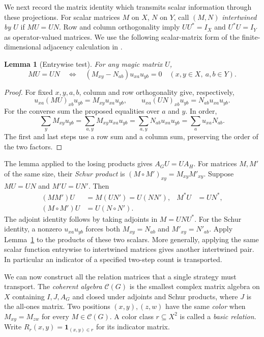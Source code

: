 \documentclass[11pt,reqno]{amsart}
\numberwithin{equation}{section}
\newtheorem{lemma}[theorem]{Lemma}
\theoremstyle{definition}
\begin{document}
\noindent We next record the matrix identity which transmits scalar information through these projections.
For scalar matrices $M$ on $X$, $N$ on $Y$, call $(M,N)$
\emph{intertwined by $U$} if $MU=UN$. Row and column orthogonality imply
$UU^*=I_X$ and $U^*U=I_Y$ as operator-valued matrices. We use the
following scalar-matrix form of the finite-dimensional adjacency calculation in
\cite[proof of Thm.~5.8]{AMRSSV}.

\begin{lemma}[Entrywise test]\label{lem:transport-test}
For any magic matrix $U$,
\[
 MU=UN\quad\Longleftrightarrow\quad
 (M_{xy}-N_{ab})u_{xa}u_{yb}=0
 \quad(x,y\in X,\ a,b\in Y).
\]
\end{lemma}
\begin{proof}
For fixed $x,y,a,b$, column and row orthogonality give, respectively,
\[
 u_{xa}(MU)_{xb}u_{yb}=M_{xy}u_{xa}u_{yb},
 \qquad
 u_{xa}(UN)_{xb}u_{yb}=N_{ab}u_{xa}u_{yb}.
\]
For the converse sum the proposed equalities over $a$ and $y$. In order,
\[
 \sum_y M_{xy}u_{yb}
 =\sum_{a,y} M_{xy}u_{xa}u_{yb}
 =\sum_{a,y} N_{ab}u_{xa}u_{yb}
 =\sum_a u_{xa}N_{ab}.
\]
The first and last steps use a row sum and a column sum, preserving the order of the two factors.
\end{proof}

The lemma applied to the losing products gives $A_GU=UA_H$.
For matrices $M,M'$ of the same size, their \emph{Schur product} is
$(M\circ M')_{xy}=M_{xy}M'_{xy}$. Suppose $MU=UN$ and $M'U=UN'$.
Then
\begin{align*}
 (MM')U&=M(UN')=U(NN'),&
 M^*U&=UN^*,\\
 (M\circ M')U&=U(N\circ N'). &&
\end{align*}
The adjoint identity follows by taking adjoints in $M=UNU^*$.
For the Schur identity, a nonzero $u_{xa}u_{yb}$ forces both
$M_{xy}=N_{ab}$ and $M'_{xy}=N'_{ab}$. Apply
Lemma~\ref{lem:transport-test} to the products of these two scalars.
More generally, applying the same scalar function entrywise to intertwined matrices gives another intertwined pair.
In particular an indicator of a specified two-step count is transported.

We can now construct all the relation matrices that a single strategy must transport.
The \emph{coherent algebra} $\mathcal C(G)$ is the smallest complex matrix
algebra on $X$ containing $I,J,A_G$ and closed under adjoints and Schur
products, where $J$ is the all-ones matrix. Two positions $(x,y),(z,w)$
have the same \emph{color} when $M_{xy}=M_{zw}$ for every $M\in\mathcal C(G)$.
A color class $r\subseteq X^2$ is called a \emph{basic relation}. Write
$R_r(x,y)=\mathbf{1}_{(x,y)\in r}$ for its indicator matrix.
\end{document}
